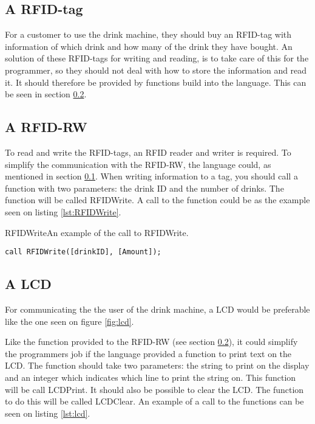 \subsection{A RFID-tag}
\label{sec:RFIDtag}
For a customer to use the drink machine, they should buy an RFID-tag with information of which drink and how many of the drink they have bought. An solution of these RFID-tags for writing and reading, is to take care of this for the programmer, so they should not deal with how to store the information and read it. It should therefore be provided by functions build into the language. This can be seen in section \ref{sec:RFIDRW}.

\subsection{A RFID-RW}
\label{sec:RFIDRW}
To read and write the RFID-tags, an RFID reader and writer is required. To simplify the communication with the RFID-RW, the language could, as mentioned in section \ref{sec:RFIDtag}. When writing information to a tag, you should call a function with two parameters: the drink ID and the number of drinks. The function will be called RFIDWrite. A call to the function could be as the example seen on listing \ref{lst:RFIDWrite}.

\begin{code}{RFIDWrite}{An example of the call to RFIDWrite.}
\begin{lstlisting}[mathescape]
call RFIDWrite([drinkID], [Amount]);
\end{lstlisting}
\end{code}

\subsection{A LCD}
For communicating the the user of the drink machine, a LCD would be preferable like the one seen on figure \ref{fig:lcd}. 


Like the function provided to the RFID-RW (see section \ref{sec:RFIDRW}), it could simplify the programmers job if the language provided a function to print text on the LCD. The function should take two parameters: the string to print on the display and an integer which indicates which line to print the string on. This function will be call LCDPrint. It should also be possible to clear the LCD. The function to do this will be called LCDClear. An example of a call to the functions can be seen on listing \ref{lst:lcd}.

